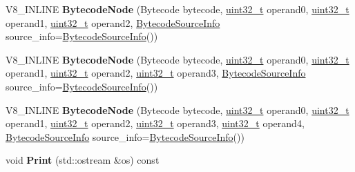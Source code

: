 \begin{DoxyCompactItemize}
V8\+\_\+\+I\+N\+L\+I\+NE {\bfseries Bytecode\+Node} (Bytecode bytecode, \mbox{\hyperlink{classuint32__t}{uint32\+\_\+t}} operand0, \mbox{\hyperlink{classuint32__t}{uint32\+\_\+t}} operand1, \mbox{\hyperlink{classuint32__t}{uint32\+\_\+t}} operand2, \mbox{\hyperlink{classv8_1_1internal_1_1interpreter_1_1BytecodeSourceInfo}{Bytecode\+Source\+Info}} source\+\_\+info=\mbox{\hyperlink{classv8_1_1internal_1_1interpreter_1_1BytecodeSourceInfo}{Bytecode\+Source\+Info}}())
\item 
\mbox{\label{classv8_1_1internal_1_1interpreter_1_1BytecodeNode_a03b3695d187534195127265a3cb21673}} 
V8\+\_\+\+I\+N\+L\+I\+NE {\bfseries Bytecode\+Node} (Bytecode bytecode, \mbox{\hyperlink{classuint32__t}{uint32\+\_\+t}} operand0, \mbox{\hyperlink{classuint32__t}{uint32\+\_\+t}} operand1, \mbox{\hyperlink{classuint32__t}{uint32\+\_\+t}} operand2, \mbox{\hyperlink{classuint32__t}{uint32\+\_\+t}} operand3, \mbox{\hyperlink{classv8_1_1internal_1_1interpreter_1_1BytecodeSourceInfo}{Bytecode\+Source\+Info}} source\+\_\+info=\mbox{\hyperlink{classv8_1_1internal_1_1interpreter_1_1BytecodeSourceInfo}{Bytecode\+Source\+Info}}())
\item 
\mbox{\label{classv8_1_1internal_1_1interpreter_1_1BytecodeNode_af20ee560eb9128fb949fbaf92c0b7afa}} 
V8\+\_\+\+I\+N\+L\+I\+NE {\bfseries Bytecode\+Node} (Bytecode bytecode, \mbox{\hyperlink{classuint32__t}{uint32\+\_\+t}} operand0, \mbox{\hyperlink{classuint32__t}{uint32\+\_\+t}} operand1, \mbox{\hyperlink{classuint32__t}{uint32\+\_\+t}} operand2, \mbox{\hyperlink{classuint32__t}{uint32\+\_\+t}} operand3, \mbox{\hyperlink{classuint32__t}{uint32\+\_\+t}} operand4, \mbox{\hyperlink{classv8_1_1internal_1_1interpreter_1_1BytecodeSourceInfo}{Bytecode\+Source\+Info}} source\+\_\+info=\mbox{\hyperlink{classv8_1_1internal_1_1interpreter_1_1BytecodeSourceInfo}{Bytecode\+Source\+Info}}())
\item 
\mbox{\label{classv8_1_1internal_1_1interpreter_1_1BytecodeNode_acf8acb70734fe8de9722162012a99f0c}} 
void {\bfseries Print} (std\+::ostream \&os) const
\item 
\mbox{\label{classv8_1_1internal_1_1interpreter_1_1BytecodeNode_a08ae763433a0a8954d2725439aa52d21}} 

\end{DoxyCompactItemize}
